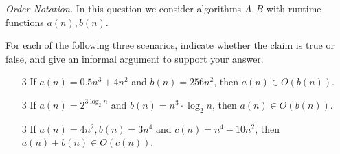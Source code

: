 \item [9]{\em Order Notation.} In this question we consider  algorithms $A,B$ with runtime functions $a(n),b(n)$.

For each of the following three scenarios, indicate whether the claim 
is true or false, and give an informal argument to support your answer.
\begin{enumerate}
    \item [3] If $a(n)=0.5n^3 + 4n^2$ and $b(n)=256n^2$, then $a(n) \in O(b(n))$.
    \vspace{2in}
    \item [3] If $a(n)=2^{3\log_2 n}$ and $b(n)=n^3 \cdot \log_{2}{n}$, then $a(n) \in O(b(n))$.
    \vspace{2in}
    \item [3] If $a(n)=4n^2, b(n)=3n^4$ and $c(n)=n^4-10n^2$, then $a(n) + b(n) \in O(c(n))$.
\end{enumerate}





